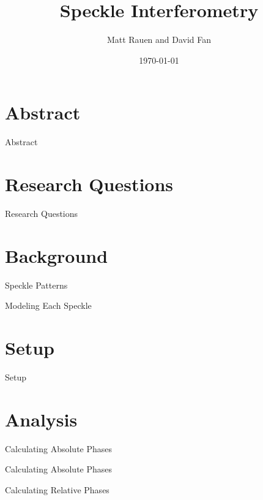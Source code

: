 \documentclass[pdf]{beamer}
\title{Speckle Interferometry}
\author{Matt Rauen and David Fan}
\date{\today}
\begin{document}
\begin{frame}
\titlepage
\end{frame}

\section{Abstract}
\begin{frame}{Abstract}

\end{frame}

\section{Research Questions}
\begin{frame}{Research Questions}

\end{frame}

\section{Background}
\begin{frame}{Speckle Patterns}

\end{frame}

\begin{frame}{Modeling Each Speckle}

\end{frame}

\section{Setup}
\begin{frame}{Setup}

\end{frame}

\section{Analysis}
\begin{frame}{Calculating Absolute Phases}

\end{frame}

\begin{frame}{Calculating Absolute Phases}

\end{frame}

\begin{frame}{Calculating Relative Phases}

\end{frame}
\end{document}
